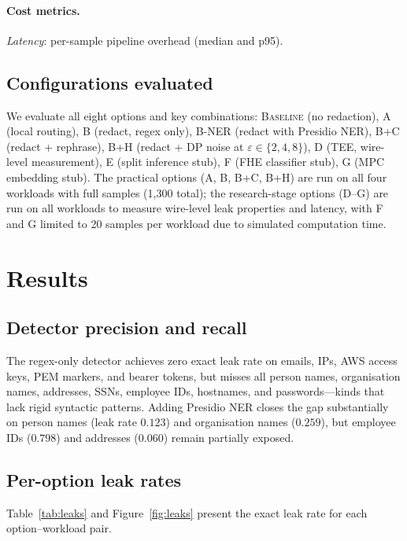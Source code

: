 \documentclass[11pt,a4paper]{article}
\begin{document}
\paragraph{Cost metrics.}
\emph{Latency}: per-sample pipeline overhead (median and p95).

\subsection{Configurations evaluated}

We evaluate all eight options and key combinations:
\textsc{Baseline} (no redaction),
\textsc{A} (local routing),
\textsc{B} (redact, regex only),
\textsc{B-NER} (redact with Presidio NER),
\textsc{B+C} (redact + rephrase),
\textsc{B+H} (redact + DP noise at $\varepsilon \in \{2, 4, 8\}$),
\textsc{D} (TEE, wire-level measurement),
\textsc{E} (split inference stub),
\textsc{F} (FHE classifier stub),
\textsc{G} (MPC embedding stub).
The practical options (A, B, B+C, B+H) are run on all four workloads
with full samples (1{,}300 total); the research-stage options (D--G)
are run on all workloads to measure wire-level leak properties and
latency, with F and G limited to 20 samples per workload due to
simulated computation time.

\section{Results}
\label{sec:results}

\subsection{Detector precision and recall}

The regex-only detector achieves zero exact leak rate on emails,
IPs, AWS access keys, PEM markers, and bearer tokens, but misses
all person names, organisation names, addresses, SSNs, employee
IDs, hostnames, and passwords---kinds that lack rigid syntactic
patterns.  Adding Presidio NER closes the gap substantially on
person names (leak rate $0.123$) and organisation names ($0.259$),
but employee IDs ($0.798$) and addresses ($0.060$) remain
partially exposed.

\subsection{Per-option leak rates}

Table~\ref{tab:leaks} and Figure~\ref{fig:leaks} present the exact
leak rate for each option--workload pair.
\end{document}
